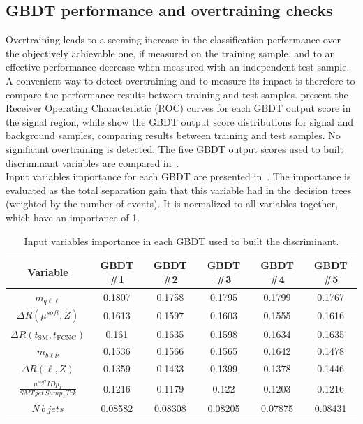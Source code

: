 \subsection {GBDT performance and overtraining checks }
Overtraining  leads  to  a  seeming  increase  in  the  classification performance  over  the
objectively  achievable  one,  if  measured  on  the  training  sample,  and  to  an  effective
performance decrease when measured with an independent test sample.  A convenient way to detect overtraining and to measure its impact is therefore to compare the performance results between training and test samples.  present the Receiver Operating  Characteristic (ROC) curves for each GBDT output score in the signal region, while  show the GBDT output score distributions for signal and background samples, comparing results between training and test samples.
No significant overtraining is detected. The five GBDT output scores used to
built discriminant variables are compared in~.  %
\\Input variables importance for each GBDT are presented in~. The importance is evaluated as the total separation gain that this variable had in the decision trees (weighted by the number of events). It is normalized to all variables together, which have an importance of 1.
\begin{table}[!htbp]
	\small
	\centering
	\begin{tabular}{cccccc}
		\toprule
		Variable & GBDT \#1 & GBDT \#2 & GBDT \#3 & GBDT \#4 & GBDT \#5 \\
		\midrule
		$m_{q\ell\ell}$  &  0.1807  &  0.1758  &  0.1795  &  0.1799  &  0.1767  \\ 
		$\Delta R(\mu^{soft},Z)$  &  0.1613  &  0.1597  &  0.1603  &  0.1555  &  0.1616  \\ 
		$\Delta R(t_{\text{SM}},t_{\text{FCNC}})$  &  0.161  &  0.1635  &  0.1598  &  0.1634  &  0.1635  \\ 
		$m_{b\ell\nu}$  &  0.1536  &  0.1566  &  0.1565  &  0.1642  &  0.1478  \\ 
		$\Delta R(\ell,Z)$  &  0.1359  &  0.1433  &  0.1399  &  0.1378  &  0.1446  \\ 
		$\frac{\mu^{soft} ID p_{T}}{SMT\,jet\,Sum p_{T} Trk}$  &  0.1216  &  0.1179  &  0.122  &  0.1203  &  0.1216  \\ 
		$N\,b\,jets$  &  0.08582  &  0.08308  &  0.08205  &  0.07875  &  0.08431  \\ 
		\bottomrule
	\end{tabular}
	\caption{
	Input variables importance in each GBDT used to built the \Dthree discriminant.
}%
\label{tab:D3importance}
\end{table}

